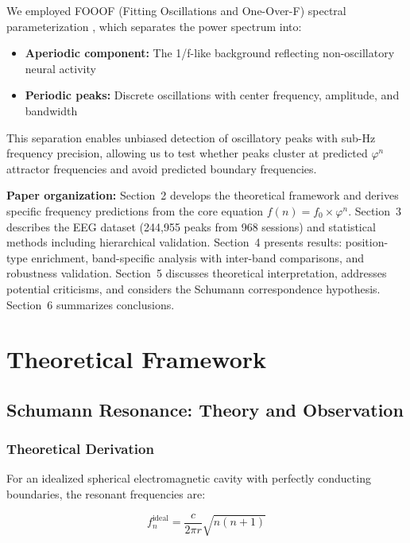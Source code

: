 \documentclass[11pt,a4paper]{article}
\newcommand{\phisym}{\varphi}
\newcommand{\fzero}{f_0}
\begin{document}
We employed FOOOF (Fitting Oscillations and One-Over-F) spectral parameterization \citep{donoghue2020}, which separates the power spectrum into:
\begin{itemize}
    \item \textbf{Aperiodic component:} The 1/f-like background reflecting non-oscillatory neural activity
    \item \textbf{Periodic peaks:} Discrete oscillations with center frequency, amplitude, and bandwidth
\end{itemize}

This separation enables unbiased detection of oscillatory peaks with sub-Hz frequency precision, allowing us to test whether peaks cluster at predicted $\phisym^n$ attractor frequencies and avoid predicted boundary frequencies.

\textbf{Paper organization:} Section~2 develops the theoretical framework and derives specific frequency predictions from the core equation $f(n) = \fzero \times \phisym^n$. Section~3 describes the EEG dataset (244,955 peaks from 968 sessions) and statistical methods including hierarchical validation. Section~4 presents results: position-type enrichment, band-specific analysis with inter-band comparisons, and robustness validation. Section~5 discusses theoretical interpretation, addresses potential criticisms, and considers the Schumann correspondence hypothesis. Section~6 summarizes conclusions.

\section{Theoretical Framework}

\subsection{Schumann Resonance: Theory and Observation}

\subsubsection{Theoretical Derivation}

For an idealized spherical electromagnetic cavity with perfectly conducting boundaries, the resonant frequencies are:

\begin{equation}
f_n^{\text{ideal}} = \frac{c}{2\pi r}\sqrt{n(n+1)}
\label{eq:ideal_cavity}
\end{equation}
\end{document}
